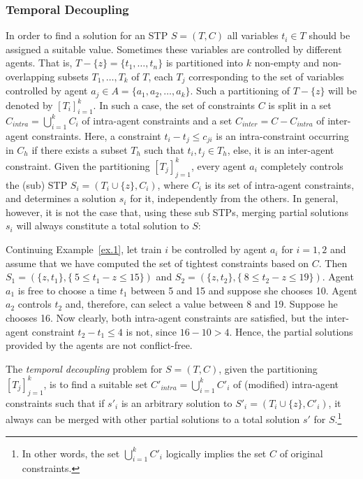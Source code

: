 \subsubsection{Temporal Decoupling  }
In order to find a solution for an STP $S = (T, C)$ all variables $t_i \in T$ should be assigned a suitable value. Sometimes these variables are controlled by different agents. That is, $T - \{z\} = \{t_1,\ldots, t_n\}$ is partitioned into $k$ non-empty and non-overlapping subsets $T_1,\ldots,T_k$ of $T$, each $T_j$ corresponding to the set of variables controlled by agent $a_j\in A= \{a_1, a_2, \ldots, a_k\}$. Such a partitioning of $T -\{z\}$ will be denoted by $[T_i]^k_{i=1}$. In such a case, the set of constraints $C$ is split in a set $C_{intra}= \bigcup^k_{i=1} C_{i}$  of intra-agent constraints and a set $C_{inter} = C - C_{intra}$ of inter-agent constraints. Here, a constraint $t_i - t_j \leq c_{ji}$ is an intra-constraint occurring in $C_h$ if there exists a subset $T_h$ such that $t_i, t_j \in T_h$, else, it is an inter-agent constraint. Given the partitioning $[T_j]^k_{j=1}$, every agent $a_i$ completely controls the (sub) STP $S_i = (T_i \cup \{z\}, C_i)$, where $C_i$ is its set of intra-agent constraints, and determines a solution $s_i$ for it, independently from the others. 
In general, however, it is not the case that, using these sub STPs, merging partial solutions $s_i$ will always constitute a total solution to $S$:
\begin{example} \label{ex.3}
Continuing Example~\ref{ex.1}, let train $i$ be controlled by agent $a_i$ for $i=1,2$ and assume that we have computed 
the set of tightest constraints based on $C$.
Then $S_1 = (\{z, t_1\}, \{\ 5 \leq  t_1 - z \leq 15 \})$ and $S_2 =   (\{z, t_2\}, \{\ 8 \leq  t_2 - z \leq 19 \})$.
Agent $a_1$ is free to choose a time $t_1$ between 5 and 15 and suppose she chooses 10.
Agent $a_2$ controls $t_2$ and, therefore, can select a value between 8 and 19. Suppose he chooses 16.
Now clearly, both intra-agent constraints are satisfied, but the inter-agent constraint $t_2 - t_1 \leq 4$ is not, since $16 - 10 > 4$. 
Hence, the partial solutions provided by the agents are not conflict-free.\blbox
\end{example}
The \emph{temporal decoupling} problem for $S = (T, C)$, given the partitioning $[T_j]^k_{j=1}$, is to find a suitable set $C'_{intra}= \bigcup^k_{i=1} C'_{i}$ of (modified) intra-agent constraints such that if $s'_i$ is an arbitrary solution to $S'_i = (T_i \cup \{z\}, C'_i)$, it always can be merged with other partial solutions to a total solution $s'$ for $S$.\footnote{In other words, the set $\bigcup^k_{i=1} C'_i$ logically implies the set $C$ of original constraints.}

